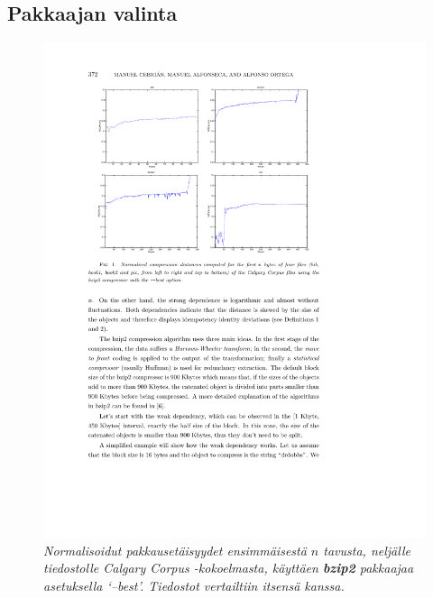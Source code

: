 \documentclass[12pt,finnish]{tktltiki2}
\theoremstyle{definition}
\theoremstyle{remark}
\begin{document}

  \subsection{Pakkaajan valinta} %
  \label{sub:pakkaajan_valinta}

    \begin{figure}[tb]
      \includegraphics[width=\textwidth]{img/bzip2-best}
      \caption{\emph{Normalisoidut pakkausetäisyydet ensimmäisestä $n$ tavusta, neljälle tiedostolle Calgary Corpus -kokoelmasta, käyttäen \textbf{bzip2} pakkaajaa asetuksella `--best'. Tiedostot vertailtiin itsensä kanssa.} \cite{cebrian2005common}}
      \label{fig:bzip2-best}
    \end{figure}
\end{document}
